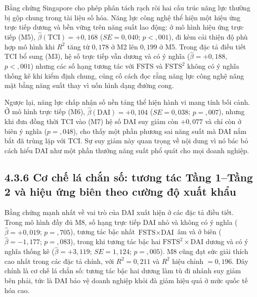 \documentclass[
  a4paper,
  13pt]{extreport}
\begin{document}
Bằng chứng Singapore cho phép phân tách rạch ròi hai cấu trúc năng lực
thường bị gộp chung trong tài liệu số hóa. Năng lực công nghệ thể hiện
một hiệu ứng trực tiếp dương và bền vững trên năng suất lao động: ở mô
hình hiệu ứng trực tiếp (M5), \(\hat{\beta}(\text{TCI}) = +0{,}168\)
(\(SE = 0{,}040\); \(p < {,}001\)), đi kèm cải thiện độ phù hợp mô hình
khi \(R^2\) tăng từ \(0{,}178\) ở M2 lên \(0{,}199\) ở M5. Trong đặc tả
điều tiết TCI bổ sung (M3), hệ số trực tiếp vẫn dương và có ý nghĩa
(\(\hat{\beta} = +0{,}188\), \(p < {,}001\)) nhưng các số hạng tương tác
với \(\text{FSTS}\) và \(\text{FSTS}^2\) không có ý nghĩa thống kê khi
kiểm định chung, củng cố cách đọc rằng năng lực công nghệ nâng mặt bằng
năng suất thay vì uốn hình dạng đường cong.

Ngược lại, năng lực chấp nhận số nền tảng thể hiện hành vi mang tính bối
cảnh. Ở mô hình trực tiếp (M6), \(\hat{\beta}(\text{DAI}) = +0{,}104\)
(\(SE = 0{,}038\); \(p = {,}007\)), nhưng khi đưa đồng thời TCI vào (M7)
hệ số DAI suy giảm còn \(+0{,}077\) và chỉ còn ở biên ý nghĩa
(\(p = {,}048\)), cho thấy một phần phương sai năng suất mà DAI nắm bắt
đã trùng lặp với TCI. Sự suy giảm này quan trọng về nội dung vì nó bác
bỏ cách hiểu DAI như một phần thưởng năng suất phổ quát cho mọi doanh
nghiệp.

\hypertarget{cux1a1-chux1ebf-luxe1-chux1eafn-sux1ed1-tux1b0ux1a1ng-tuxe1c-tux1ea7ng-1tux1ea7ng-2-vuxe0-hiux1ec7u-ux1ee9ng-biuxean-theo-cux1b0ux1eddng-ux111ux1ed9-xuux1ea5t-khux1ea9u}{%
\subsection{4.3.6 Cơ chế lá chắn số: tương tác Tầng 1--Tầng 2 và hiệu
ứng biên theo cường độ xuất
khẩu}\label{cux1a1-chux1ebf-luxe1-chux1eafn-sux1ed1-tux1b0ux1a1ng-tuxe1c-tux1ea7ng-1tux1ea7ng-2-vuxe0-hiux1ec7u-ux1ee9ng-biuxean-theo-cux1b0ux1eddng-ux111ux1ed9-xuux1ea5t-khux1ea9u}}

Bằng chứng mạnh nhất về vai trò của DAI xuất hiện ở các đặc tả điều
tiết. Trong mô hình đầy đủ M8, số hạng trực tiếp DAI nhỏ và không có ý
nghĩa (\(\hat{\beta} = +0{,}019\); \(p = {,}705\)), tương tác bậc nhất
\(\text{FSTS} \times \text{DAI}\) âm và ở biên
(\(\hat{\beta} = -1{,}177\); \(p = {,}083\)), trong khi tương tác bậc
hai \(\text{FSTS}^2 \times \text{DAI}\) dương và có ý nghĩa thống kê
(\(\hat{\beta} = +3{,}119\); \(SE = 1{,}124\); \(p = {,}005\)). M8 cũng
đạt sức giải thích cao nhất trong các đặc tả chính, với
\(R^2 = 0{,}211\) và \(R^2\) hiệu chỉnh \(= 0{,}196\). Đây chính là cơ
chế lá chắn số: tương tác bậc hai dương làm tù đi nhánh suy giảm bên
phải, tức là DAI bảo vệ doanh nghiệp khỏi đà giảm hiệu quả ở mức quốc tế
hóa cao.
\end{document}
